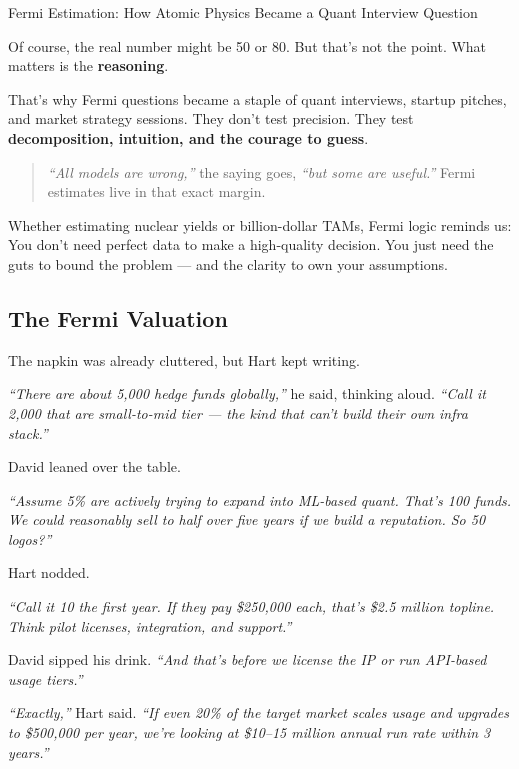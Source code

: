 \begin{HistoricalSidebar}{Fermi Estimation: How Atomic Physics Became a Quant Interview Question}
  \medskip
  
  Of course, the real number might be 50 or 80. But that’s not the point.  
  What matters is the \textbf{reasoning}.
  
  \medskip
  
  That’s why Fermi questions became a staple of quant interviews, startup pitches, and market strategy sessions.  
  They don’t test precision.  
  They test \textbf{decomposition, intuition, and the courage to guess}.
  
  \begin{quote}
  \textit{“All models are wrong,”} the saying goes, \textit{“but some are useful.”}  
  Fermi estimates live in that exact margin.
  \end{quote}
  
  \medskip
  
  Whether estimating nuclear yields or billion-dollar TAMs, Fermi logic reminds us:  
  You don’t need perfect data to make a high-quality decision.  
  You just need the guts to bound the problem — and the clarity to own your assumptions.
  
\end{HistoricalSidebar}
  


\subsection{The Fermi Valuation}

The napkin was already cluttered, but Hart kept writing.

\textit{``There are about 5{,}000 hedge funds globally,''} he said, thinking aloud. \textit{``Call it 2{,}000 
that are small-to-mid tier — the kind that can’t build their own infra stack.''}

David leaned over the table.

\textit{``Assume 5\% are actively trying to expand into ML-based quant. That’s 100 funds.  
We could reasonably sell to half over five years if we build a reputation. So 50 logos?''}

Hart nodded.

\textit{``Call it 10 the first year. If they pay \$250{,}000 each, that’s \$2.5 million topline.  
Think pilot licenses, integration, and support.''}

David sipped his drink. \textit{``And that’s before we license the IP or run API-based usage tiers.''}

\textit{``Exactly,''} Hart said. \textit{``If even 20\% of the target market scales usage and upgrades to \$500{,}000 per year,  
we’re looking at \$10–15 million annual run rate within 3 years.''}

